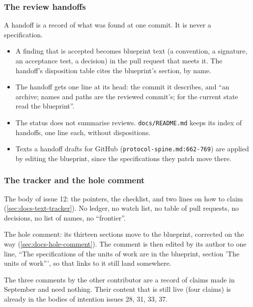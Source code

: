 \subsubsection{The review handoffs}\label{sec:docs-handoffs}

A handoff is a record of what was found at one commit. It is never a specification.

\begin{itemize}
\item A finding that is accepted becomes blueprint text (a convention, a signature, an acceptance test, a decision) in the pull request that meets it. The handoff's disposition table cites the blueprint's section, by name.
\item The handoff gets one line at its head: the commit it describes, and ``an archive; names and paths are the reviewed commit's; for the current state read the blueprint''.
\item The status does not summarise reviews. \texttt{docs/\allowbreak{}README.\allowbreak{}md} keeps its index of handoffs, one line each, without dispositions.
\item Texts a handoff drafts for GitHub (\texttt{protocol-\allowbreak{}spine.\allowbreak{}md:\allowbreak{}662-\allowbreak{}769}) are applied by editing the blueprint, since the specifications they patch move there.
\end{itemize}

\subsubsection{The tracker and the hole comment}\label{sec:docs-tracker-proposal}

The body of issue 12: the pointers, the checklist, and two lines on how to claim (\cref{sec:docs-text-tracker}). No ledger, no watch list, no table of pull requests, no decisions, no list of names, no ``frontier''.

The hole comment: its thirteen sections move to the blueprint, corrected on the way (\cref{sec:docs-hole-comment}). The comment is then edited by its author to one line, ``The specifications of the units of work are in the blueprint, section 'The units of work''', so that links to it still land somewhere.

The three comments by the other contributor are a record of claims made in September and need nothing. Their content that is still live (four claims) is already in the bodies of intention issues 28, 31, 33, 37.


